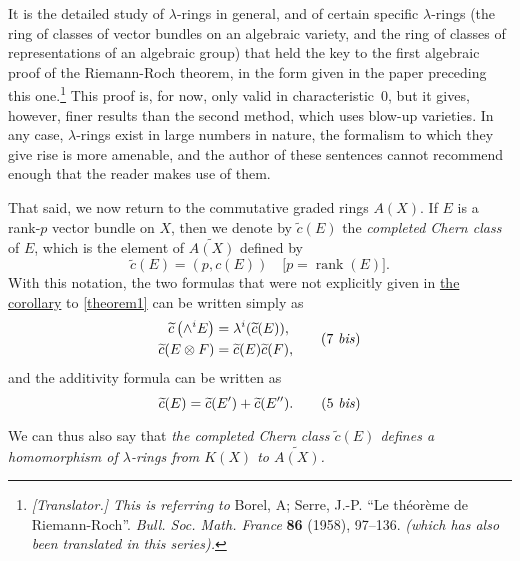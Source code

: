 \documentclass{article}
\theoremstyle{plain}
\theoremstyle{definition}
\DeclareMathOperator{\rank}{rank}
\newcommand{\oldpage}[1]{\marginpar{\footnotesize$\Big\vert$ \textit{p.~#1}}}
\begin{document}
\begin{enumerate}
    \renewcommand*{\thefootnote}{*}
    It is the detailed study of $\lambda$-rings in general, and of certain specific $\lambda$-rings (the ring of classes of vector bundles on an algebraic variety, and the ring of classes of representations of an algebraic group) that held the key to the first algebraic proof of the Riemann-Roch theorem, in the form given in the paper preceding this one.\footnote{\emph{[Translator.] This is referring to} {\sc Borel, A; Serre, J.-P.} ``Le th\'{e}or\`{e}me de Riemann-Roch''. \emph{Bull. Soc. Math. France} {\bf 86} (1958),   97--136. \emph{(which has also been translated in this series).}}
    This proof is, for now, only valid in characteristic~$0$, but it gives, however, finer results than the second method, which uses blow-up varieties.
    In any case, $\lambda$-rings exist in large numbers in nature, the formalism to which they give rise is more amenable, and the author of these sentences cannot recommend enough that the reader makes use of them.

    That said, we now return to the commutative graded rings $A(X)$.
    If $E$ is a rank-$p$ vector bundle on $X$, then we denote by $\widetilde{c}(E)$ the \emph{completed Chern class} of $E$, which is the element of $\widetilde{A(X)}$ defined by
    \[
    \label{equation14}
      \widetilde{c}(E) = (p,c(E))
      \quad\mbox{[$p=\rank(E)$].}
    \tag{14}
    \]
    With this notation, the two formulas that were not explicitly given in \hyperref[theorem1corollary]{the corollary} to \cref{theorem1} can be written simply as
    \[
    \label{equation7bis}
      \begin{aligned}
        \widetilde{c}\left(\wedge^i E\right) &= \lambda^i(\widetilde{c}(E)),
      \\\widetilde{c}(E\otimes F) &= \widetilde{c}(E)\widetilde{c}(F),
      \end{aligned}
    \tag{7 \emph{bis}}
    \]
    and the additivity formula can be written as
    \[
    \label{equation5bis}
      \widetilde{c}(E) = \widetilde{c}(E') + \widetilde{c}(E'').
    \tag{5 \emph{bis}}
    \]

\oldpage{150}
    We can thus also say that \emph{the completed Chern class $\widetilde{c}(E)$ defines a homomorphism of $\lambda$-rings from $K(X)$ to $\widetilde{A(X)}$.}


\end{enumerate}
\end{document}
